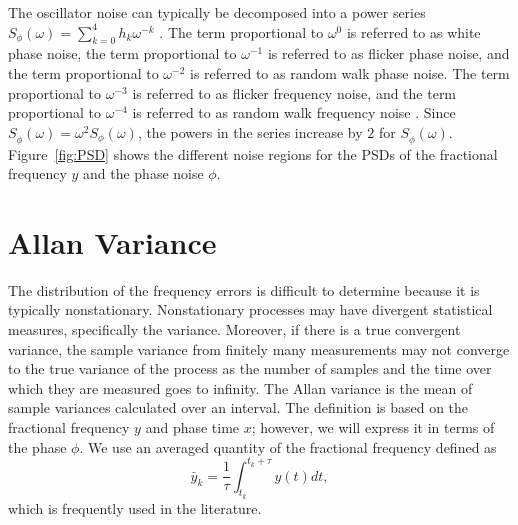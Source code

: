 The oscillator noise can typically be decomposed into a power series $S_\phi(\omega) = \sum_{k=0}^{4} h_k\omega^{-k}$ \cite{Riley1994}. The term proportional to $\omega^0$ is referred to as white phase noise, the term proportional to $\omega^{-1}$ is referred to as flicker phase noise, and the term proportional to $\omega^{-2}$ is referred to as random walk phase noise. The term proportional to $\omega^{-3}$ is referred to as flicker frequency noise, and the term proportional to $\omega^{-4}$ is referred to as random walk frequency noise \cite{Kartaschoff1978, LohWhite, LohFlicker, NISTFreqStandards}. Since $S_{\dot{\phi}}(\omega) = \omega^2 S_\phi(\omega)$, the powers in the series increase by $2$ for $S_{\dot{\phi}}(\omega)$. Figure~\ref{fig:PSD} shows the different noise regions for the PSDs of the fractional frequency $y$ and the phase noise $\phi$.


\section{Allan Variance} \label{sec:avar}

The distribution of the frequency errors is difficult to determine because it is typically nonstationary.  Nonstationary processes may have divergent statistical measures, specifically the variance. Moreover, if there is a true convergent variance, the sample variance from finitely many measurements may not converge to the true variance of the process as the number of samples and the time over which they are measured goes to infinity. The Allan variance is the mean of sample variances calculated over an interval. The definition is based on the fractional frequency $y$ and phase time $x$; however, we will express it in terms of the phase $\phi$. We use an averaged quantity of the fractional frequency defined as
\begin{equation}
\label{eq:avgy}
\bar{y}_k = \frac{1}{\tau}\int_{t_k}^{t_k+\tau} y(t)dt,
\end{equation}
which is frequently used in the literature\cite{Kartaschoff1978}.

